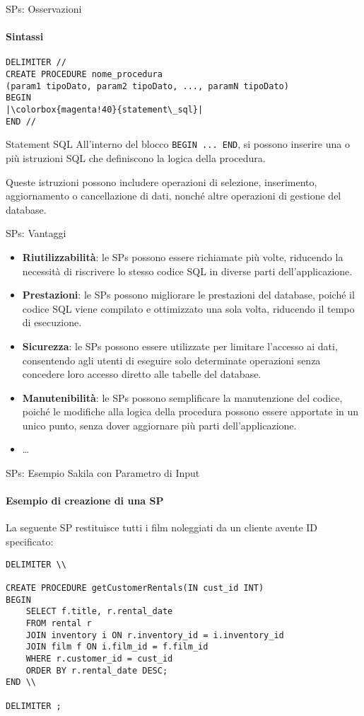 \begin{frame}[fragile]{SPs: Osservazioni}
\framesubtitle{Sintassi}
\vspace{-.8cm}
\begin{lstlisting}
DELIMITER //
CREATE PROCEDURE nome_procedura
(param1 tipoDato, param2 tipoDato, ..., paramN tipoDato)
BEGIN
|\colorbox{magenta!40}{statement\_sql}|
END //
\end{lstlisting}
\begin{minipage}{\textwidth}
    \begin{block}{Statement SQL}
    All'interno del blocco \texttt{BEGIN ... END}, si possono inserire una o pi\`u istruzioni SQL che definiscono la logica della procedura.
    
    Queste istruzioni possono includere operazioni di selezione, inserimento, aggiornamento o cancellazione di dati, nonch\'e altre operazioni di gestione del database.
    \end{block}
    \end{minipage}
\end{frame}
%
\begin{frame}[fragile]{SPs: Vantaggi}
    \begin{itemize}[<+->]
        \item \textbf{Riutilizzabilit\`a}: le SPs possono essere richiamate pi\`u volte, riducendo la necessit\`a di riscrivere lo stesso codice SQL in diverse parti dell'applicazione.
        \item \textbf{Prestazioni}: le SPs possono migliorare le prestazioni del database, poich\'e il codice SQL viene compilato e ottimizzato una sola volta, riducendo il tempo di esecuzione.
        \item \textbf{Sicurezza}: le SPs possono essere utilizzate per limitare l'accesso ai dati, consentendo agli utenti di eseguire solo determinate operazioni senza concedere loro accesso diretto alle tabelle del database.
        \item \textbf{Manutenibilit\`a}: le SPs possono semplificare la manutenzione del codice, poich\'e le modifiche alla logica della procedura possono essere apportate in un unico punto, senza dover aggiornare pi\`u parti dell'applicazione.
        \item \ldots
    \end{itemize}
\end{frame}
%
\begin{frame}[fragile]{SPs: Esempio Sakila con Parametro di Input}
\framesubtitle{Esempio di creazione di una SP}
La seguente SP restituisce tutti i film noleggiati da un cliente avente ID specificato:
\small 
\begin{lstlisting}
DELIMITER \\

CREATE PROCEDURE getCustomerRentals(IN cust_id INT)
BEGIN
    SELECT f.title, r.rental_date
    FROM rental r
    JOIN inventory i ON r.inventory_id = i.inventory_id
    JOIN film f ON i.film_id = f.film_id
    WHERE r.customer_id = cust_id
    ORDER BY r.rental_date DESC;
END \\

DELIMITER ;
\end{lstlisting}
\end{frame}
